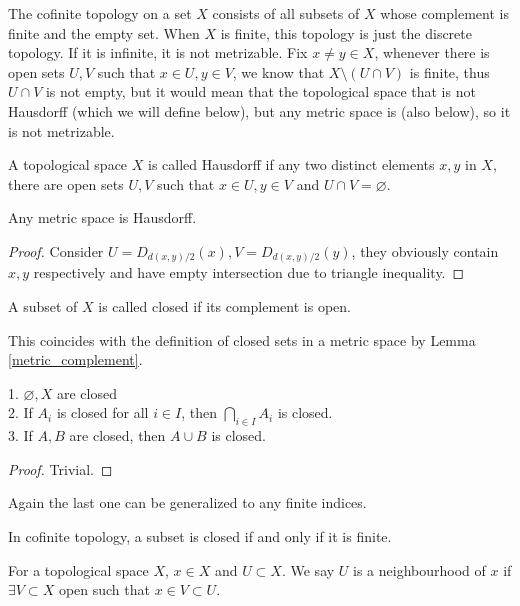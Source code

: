 \begin{example}
    The cofinite topology on a set $X$ consists of all subsets of $X$ whose complement is finite and the empty set.
    When $X$ is finite, this topology is just the discrete topology.
    If it is infinite, it is not metrizable.
    Fix $x\neq y\in X$, whenever there is open sets $U,V$ such that $x\in U, y\in V$, we know that $X\setminus(U\cap V)$ is finite, thus $U\cap V$ is not empty, but it would mean that the topological space that is not Hausdorff (which we will define below), but any metric space is (also below), so it is not metrizable.
\end{example}
\begin{definition}
    A topological space $X$ is called Hausdorff if any two distinct elements $x,y$ in $X$, there are open sets $U,V$ such that $x\in U,y\in V$ and $U\cap V=\varnothing$.
\end{definition}
\begin{proposition}
    Any metric space is Hausdorff.
\end{proposition}
\begin{proof}
    Consider $U=D_{d(x,y)/2}(x),V=D_{d(x,y)/2}(y)$, they obviously contain $x,y$ respectively and have empty intersection due to triangle inequality.
\end{proof}
\begin{definition}
    A subset of $X$ is called closed if its complement is open.
\end{definition}
This coincides with the definition of closed sets in a metric space by Lemma \ref{metric_complement}.
\begin{proposition}
    1. $\varnothing,X$ are closed\\
    2. If $A_i$ is closed for all $i\in I$, then $\bigcap_{i\in I}A_i$ is closed.\\
    3. If $A,B$ are closed, then $A\cup B$ is closed.
\end{proposition}
\begin{proof}
    Trivial.
\end{proof}
Again the last one can be generalized to any finite indices.
\begin{example}
    In cofinite topology, a subset is closed if and only if it is finite.
\end{example}
\begin{definition}
    For a topological space $X$, $x\in X$ and $U\subset X$.
    We say $U$ is a neighbourhood of $x$ if $\exists V\subset X$ open such that $x\in V\subset U$.
\end{definition}
